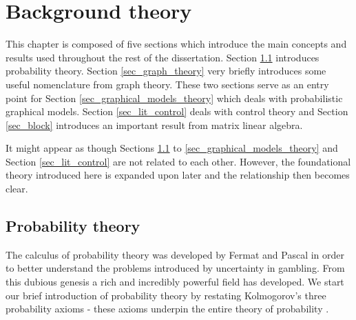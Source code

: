 \chapter{Background theory}
\label{sec_back_theory}
This chapter is composed of five sections which introduce the main concepts and results used throughout the rest of the dissertation. Section \ref{sec_prob_theory} introduces probability theory. Section \ref{sec_graph_theory} very briefly introduces some useful nomenclature from graph theory. These two sections serve as an entry point for Section \ref{sec_graphical_models_theory} which deals with probabilistic graphical models. Section \ref{sec_lit_control} deals with control theory and Section \ref{sec_block} introduces an important result from matrix linear algebra.

It might appear as though Sections \ref{sec_prob_theory} to \ref{sec_graphical_models_theory} and Section \ref{sec_lit_control} are not related to each other. However, the foundational theory introduced here is expanded upon later and the relationship then becomes clear.

\section{Probability theory}
\label{sec_prob_theory}
The calculus of probability theory was developed by Fermat and Pascal in order to better understand the problems introduced by uncertainty in gambling. From this dubious genesis a rich and incredibly powerful field has developed. We start our brief introduction of probability theory by restating Kolmogorov's three probability axioms - these axioms underpin the entire theory of probability \cite{koller}.

